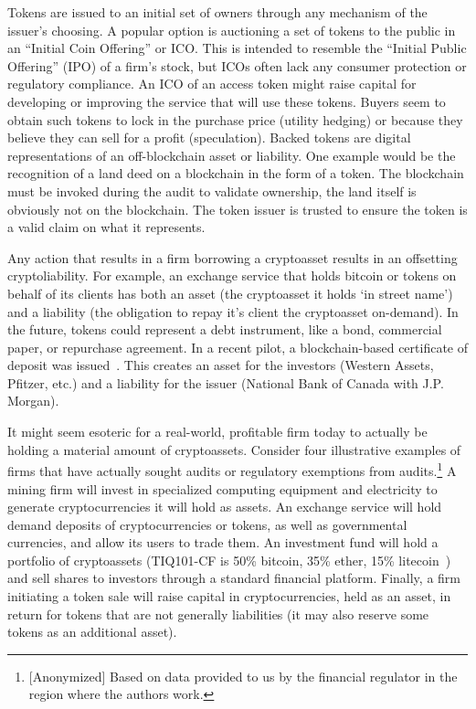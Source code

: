 Tokens are issued to an initial set of owners through any mechanism of the issuer{'}s choosing. A popular option is auctioning a set of tokens to the public in an ``Initial Coin Offering'' or ICO. This is intended to resemble the ``Initial Public Offering'' (IPO) of a firm{'}s stock, but ICOs often lack any consumer protection or regulatory compliance. An ICO of an access token might raise capital for developing or improving the service that will use these tokens. Buyers seem to obtain such tokens to lock in the purchase price (\ie utility hedging) or because they believe they can sell for a profit (\ie speculation). Backed tokens are digital representations of an off-blockchain asset or liability. One example would be the recognition of a land deed on a blockchain in the form of a token. The blockchain must be invoked during the audit to validate ownership, the land itself is obviously not on the blockchain. The token issuer is trusted to ensure the token is a valid claim on what it represents. 

Any action that results in a firm borrowing a cryptoasset results in an offsetting cryptoliability. For example, an exchange service that holds bitcoin or tokens on behalf of its clients has both an asset (the cryptoasset it holds `in street name') and a liability (the obligation to repay it's client the cryptoasset on-demand). In the future, tokens could represent a debt instrument, like a bond, commercial paper, or repurchase agreement. In a recent pilot, a blockchain-based certificate of deposit was issued~\cite{NBCJPMorganBlockchain}. This creates an asset for the investors (Western Assets, Pfitzer, etc.) and a liability for the issuer (National Bank of Canada with J.P. Morgan). 

It might seem esoteric for a real-world, profitable firm today to actually be holding a material amount of cryptoassets. Consider four illustrative examples of firms that have actually sought audits or regulatory exemptions from audits.\footnote{[Anonymized] Based on data provided to us by the financial regulator in the region where the authors work.} A mining firm will invest in specialized computing equipment and electricity to generate cryptocurrencies it will hold as assets. An exchange service will hold demand deposits of cryptocurrencies or tokens, as well as governmental currencies, and allow its users to trade them. An investment fund will hold a portfolio of cryptoassets (\eg TIQ101-CF is 50\% bitcoin, 35\% ether, 15\% litecoin~\cite{3iq18}) and sell shares to investors through a standard financial platform. Finally, a firm initiating a token sale will raise capital in cryptocurrencies, held as an asset, in return for tokens that are not generally liabilities (it may also reserve some tokens as an additional asset).

